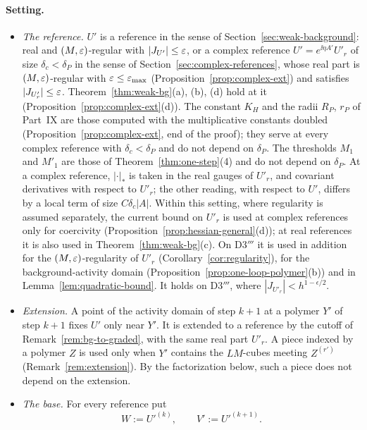\paragraph{Setting.}
\begin{itemize}
\item \emph{The reference.} $U'$ is a reference in the sense of Section~\ref{sec:weak-background}: real and $(M,\varepsilon)$-regular with $|J_{U'}|\le\varepsilon$, or a complex reference $U'=e^{\ii\eta A'}U'_r$ of size $\delta_c<\delta_P$ in the sense of Section~\ref{sec:complex-references}, whose real part is $(M,\varepsilon)$-regular with $\varepsilon\le\varepsilon_{\max}$ (Proposition~\ref{prop:complex-ext}) and satisfies $|J_{U'_r}|\le\varepsilon$. Theorem~\ref{thm:weak-bg}(a), (b), (d) hold at it (Proposition~\ref{prop:complex-ext}(d)). The constant $K_H$ and the radii $R_P$, $r_P$ of Part~IX are those computed with the multiplicative constants doubled (Proposition~\ref{prop:complex-ext}, end of the proof); they serve at every complex reference with $\delta_c<\delta_P$ and do not depend on $\delta_P$. The thresholds $M_1$ and $M'_1$ are those of Theorem~\ref{thm:one-step}(4) and do not depend on $\delta_P$. At a complex reference, $|\cdot|_*$ is taken in the real gauges of $U'_r$, and covariant derivatives with respect to $U'_r$; the other reading, with respect to $U'$, differs by a local term of size $C\delta_c|A|$. Within this setting, where regularity is assumed separately, the current bound on $U'_r$ is used at complex references only for coercivity (Proposition~\ref{prop:hessian-general}(d)); at real references it is also used in Theorem~\ref{thm:weak-bg}(c). On D3$'''$ it is used in addition for the $(M,\varepsilon)$-regularity of $U'_r$ (Corollary~\ref{cor:regularity}), for the background-activity domain (Proposition~\ref{prop:one-loop-polymer}(b)) and in Lemma~\ref{lem:quadratic-bound}. It holds on D3$'''$, where $|J_{U'_r}|<h^{1-\epsilon/2}$.
\item \emph{Extension.} A point of the activity domain of step $k+1$ at a polymer $Y'$ of step $k+1$ fixes $U'$ only near $Y'$. It is extended to a reference by the cutoff of Remark~\ref{rem:bg-to-graded}, with the same real part $U'_r$. A piece indexed by a polymer $Z$ is used only when $Y'$ contains the $LM$-cubes meeting $Z^{(r')}$ (Remark~\ref{rem:extension}). By the factorization below, such a piece does not depend on the extension.
\item \emph{The base.} For every reference put
\[
W:=U'^{(k)},\qquad V':=U'^{(k+1)} .
\]

\end{itemize}
